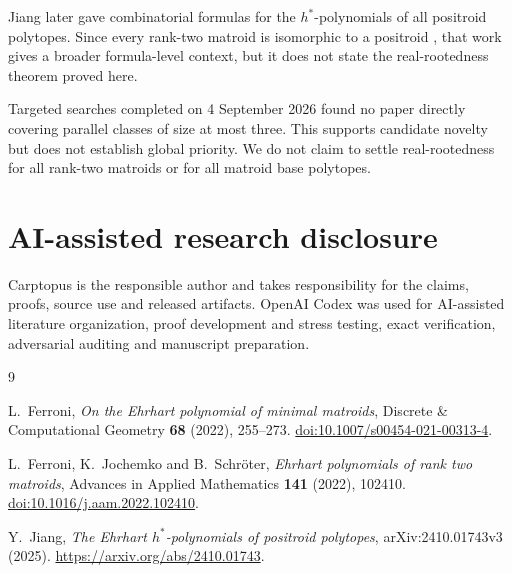 \documentclass[11pt]{article}
\begin{document}
Jiang \cite{jiang} later gave combinatorial formulas for the $h^*$-polynomials of all
positroid polytopes. Since every rank-two matroid is isomorphic to a positroid
\cite[Corollary~6.2]{fjs}, that work gives a broader formula-level context, but it
does not state the real-rootedness theorem proved here.

Targeted searches completed on 4 September 2026 found no paper directly
covering parallel classes of size at most three. This supports candidate
novelty but does not establish global priority. We do not claim to settle
real-rootedness for all rank-two matroids or for all matroid base polytopes.

\section*{AI-assisted research disclosure}


Carptopus is the responsible author and takes responsibility for the claims,
proofs, source use and released artifacts. OpenAI Codex was used for
AI-assisted literature organization, proof development and stress testing,
exact verification, adversarial auditing and manuscript preparation.

\begin{thebibliography}{9}
\footnotesize
\raggedright

L.~Ferroni,
\emph{On the Ehrhart polynomial of minimal matroids},
Discrete \& Computational Geometry \textbf{68} (2022), 255--273.
\href{https://doi.org/10.1007/s00454-021-00313-4}{doi:10.1007/s00454-021-00313-4}.

L.~Ferroni, K.~Jochemko and B.~Schr\"oter,
\emph{Ehrhart polynomials of rank two matroids},
Advances in Applied Mathematics \textbf{141} (2022), 102410.
\href{https://doi.org/10.1016/j.aam.2022.102410}{doi:10.1016/j.aam.2022.102410}.

Y.~Jiang,
\emph{The Ehrhart $h^*$-polynomials of positroid polytopes},
arXiv:2410.01743v3 (2025).
\url{https://arxiv.org/abs/2410.01743}.

\end{thebibliography}
\end{document}
